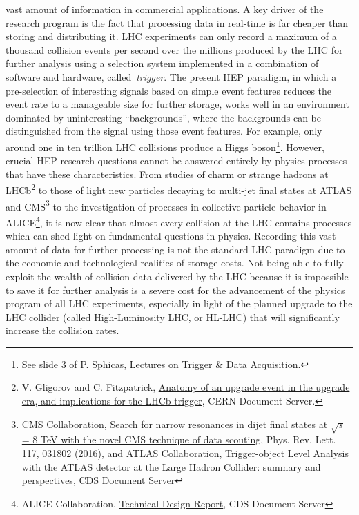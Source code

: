 vast amount of information in commercial applications. 
A key driver of the \acronym research program is the fact that processing data in
real-time is far cheaper than storing and distributing it. 
LHC experiments can only record a maximum of a thousand collision events per second
over the millions produced by the LHC for further analysis using a selection system 
implemented in a combination of software and hardware, called~\textit{trigger}.
The present HEP paradigm, in which a pre-selection of interesting signals based on simple event features
reduces the event rate to a manageable size for further storage, works well in an environment
dominated by uninteresting ``backgrounds'', where the backgrounds can be distinguished from the 
signal using those event features. For example, only around
one in ten trillion LHC collisions produce a Higgs boson\footnote{See slide 3 of \href{https://indico.cern.ch/event/a062849/material/1/1.pdf}{P. Sphicas, Lectures on Trigger \& Data Acquisition}.}.
However, crucial HEP research questions cannot be answered entirely by
physics processes that have these characteristics. 
From studies of charm or strange hadrons at LHCb\footnote{V. Gligorov and C. Fitzpatrick, \href{http://cds.cern.ch/record/1670985}{Anatomy of an upgrade event in the upgrade era, and implications for the LHCb trigger}, CERN Document Server.}
to those of light new particles decaying to multi-jet final states 
at ATLAS and CMS\footnote{CMS Collaboration, \href{https://arxiv.org/abs/1604.08907}{Search for narrow resonances in dijet final states at $\sqrt{s}$ = 8 TeV with the novel CMS technique of data scouting}, Phys. Rev. Lett. 117, 031802 (2016), and ATLAS Collaboration, \href{https://cds.cern.ch/record/2295739}{Trigger-object Level Analysis with the ATLAS detector at the Large Hadron Collider: summary and perspectives}, CDS Document Server} to the investigation of processes in collective particle behavior in ALICE\footnote{ALICE Collaboration, \href{https://cds.cern.ch/record/2011297/files/ALICE-TDR-019.pdf}{Technical Design Report}, CDS Document Server}, 
it is now clear that almost every collision at the LHC
contains processes which can shed light on fundamental questions in physics. 
Recording this vast amount of data for further processing is not the 
standard LHC paradigm due to the economic and 
technological realities of storage costs. Not being able to fully exploit
the wealth of collision data delivered by the LHC because it is impossible 
to save it for further analysis is a severe cost for the
advancement of the physics program of all LHC experiments, especially in light of
the planned upgrade to the LHC collider (called High-Luminosity LHC, or HL-LHC)
that will significantly increase the collision rates. 

